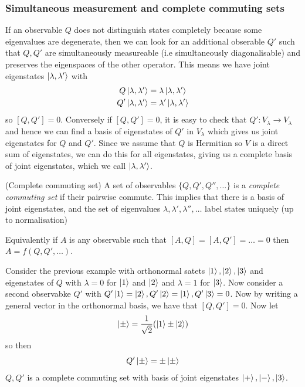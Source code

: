 \documentclass{article}
\begin{document}
\subsubsection{Simultaneous measurement and complete commuting sets}
If an observable $ Q $ does not distinguish states completely because some eigenvalues are degenerate, then we can look for an additional obserable $ Q' $ such that $ Q,Q' $ are simultaneously measureable (i.e simultaneously diagonalisable) and preserves the eigenspaces of the other operator. This means we have joint eigenstates $ \ket {\lambda,\lambda'} $ with
\begin{align*}
	Q \ket {\lambda, \lambda'} &= \lambda \ket{\lambda, \lambda'} \\
	Q' \ket{\lambda,\lambda'} &= \lambda' \ket{\lambda,\lambda'}
\end{align*}
so $ [Q,Q'] = 0 $. Conversely if $ [Q,Q'] = 0 $, it is easy to check that $ Q':V_\lambda \to V_\lambda $ and hence we can find a basis of eigenstates of $ Q' $ in $ V_\lambda $ which gives us joint eigenstates for $ Q $ and $ Q' $. Since we assume that $ Q $ is Hermitian so $ V $ is a direct sum of eigenstates, we can do this for all eigenstates, giving us a complete basis of joint eigenstates, which we call $ \ket{\lambda,\lambda'} $.
\begin{definition}
	(Complete commuting set) A set of observables $ \{Q,Q',Q'',\dots \} $ is a \textit{complete commuting set} if their pairwise commute. This implies that there is a basis of joint eigenstates, and the set of eigenvalues $ \lambda,\lambda',\lambda'',\dots $ label states uniquely (up to normalisation)
\end{definition}
\begin{remark}
	Equivalently if $ A $ is any observable such that $ [A,Q]=[A,Q']=\dots = 0 $ then $ A = f(Q,Q',\dots) $.
\end{remark}
\begin{example}
	Consider the previous example with orthonormal satets $ \ket 1, \ket 2, \ket 3 $ and eigenstates of $ Q $ with $ \lambda = 0 $ for $ \ket 1 $ and $ \ket 2 $ and $ \lambda = 1 $ for $ \ket 3 $. Now consider a second observabke $ Q' $ with $ Q'\ket 1 = \ket 2, Q'\ket 2 = \ket 1, Q'\ket 3 = 0 $. Now by writing a general vector in the orthonormal basis, we have that $ [Q,Q'] = 0 $. Now let 
	\[
		\ket \pm = \frac 1{\sqrt 2}(\ket 1 \pm \ket 2)
	\]
	so then
	\[
	  Q' \ket \pm = \pm \ket \pm
	\]
	$ Q,Q' $ is a complete commuting set with basis of joint eigenstates $ \ket +, \ket -, \ket 3 $.
\end{example}
\end{document}

